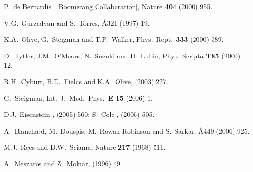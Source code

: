 \documentclass[12pt]{article}
\begin{document}
\begin{thebibliography}{66}
P.~de Bernardis \etal\ [Boomerang Collaboration],
Nature {\bf 404} (2000) 955. %

V.G.~Gurzadyan and S.~Torres,
\AA{321} (1997) 19. %

K.A.~Olive, G.~Steigman and T.P.~Walker,
Phys.\ Rept.\ {\bf 333} (2000) 389. %

D.~Tytler, J.M.~O'Meara, N.~Suzuki and D.~Lubin,
Phys.\ Scripta {\bf T85} (2000) 12. %

R.H.~Cyburt, B.D.~Fields and K.A.~Olive,
 (2003) 227. %

G.~Steigman,
Int.\ J.\ Mod.\ Phys.\ {\bf E 15} (2006) 1. %

D.J.~Eisenstein \etal,
 (2005) 560; %
S.~Cole \etal,
 (2005) 505. %

A.~Blanchard, M.~Douspis, M.~Rowan-Robinson and S.~Sarkar,
\AA{449} (2006) 925. %

M.J.~Rees and D.W.~Sciama,
Nature {\bf217} (1968) 511.

A.~Meszaros and Z.~Molnar,
 (1996) 49.


\end{thebibliography}
\end{document}
